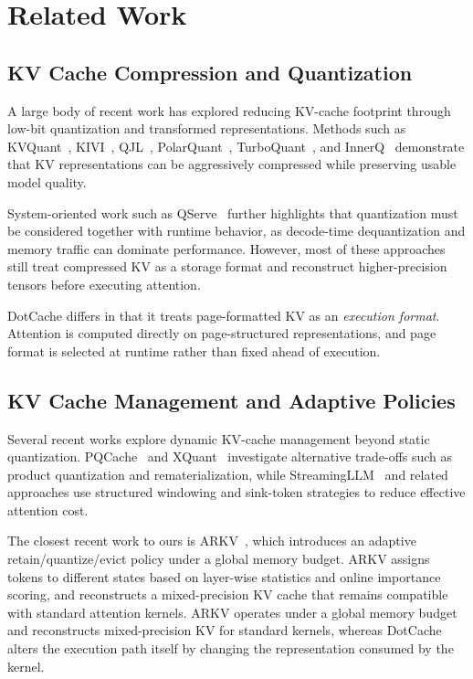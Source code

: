 \documentclass[11pt]{article}
\begin{document}
\FloatBarrier

\section{Related Work}

\subsection{KV Cache Compression and Quantization}

A large body of recent work has explored reducing KV-cache footprint through low-bit quantization and transformed representations. Methods such as KVQuant~\cite{kvquant}, KIVI~\cite{kivi}, QJL~\cite{qjl}, PolarQuant~\cite{polarquant}, TurboQuant~\cite{turboquant}, and InnerQ~\cite{innerq} demonstrate that KV representations can be aggressively compressed while preserving usable model quality.

System-oriented work such as QServe~\cite{qserve} further highlights that quantization must be considered together with runtime behavior, as decode-time dequantization and memory traffic can dominate performance. However, most of these approaches still treat compressed KV as a storage format and reconstruct higher-precision tensors before executing attention.

DotCache differs in that it treats page-formatted KV as an \emph{execution format}. Attention is computed directly on page-structured representations, and page format is selected at runtime rather than fixed ahead of execution.

\subsection{KV Cache Management and Adaptive Policies}

Several recent works explore dynamic KV-cache management beyond static quantization. PQCache~\cite{pqcache} and XQuant~\cite{xquant} investigate alternative trade-offs such as product quantization and rematerialization, while StreamingLLM~\cite{streamingllm} and related approaches use structured windowing and sink-token strategies to reduce effective attention cost.

The closest recent work to ours is ARKV~\cite{arkv}, which introduces an adaptive retain/quantize/evict policy under a global memory budget. ARKV assigns tokens to different states based on layer-wise statistics and online importance scoring, and reconstructs a mixed-precision KV cache that remains compatible with standard attention kernels.  ARKV operates under a global memory budget and reconstructs mixed-precision KV for standard kernels, whereas DotCache alters the execution path itself by changing the representation consumed by the kernel.
\end{document}

